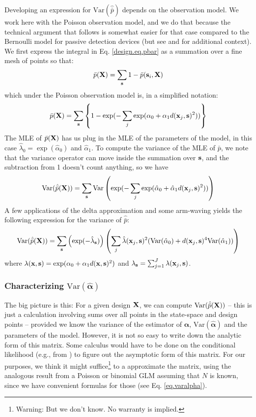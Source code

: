 Developing an expression for $\mbox{Var}(\hat{\bar{p}})$ depends on
the observation model. 
We work here with the Poisson observation model, and we do that
because the technical argument that follows is somewhat easier for
that case compared to the Bernoulli model for passive detection
devices (but see
\citet{huggins:1989} and \citet{alho:1990} for additional context). 
We first express the integral in Eq.
\ref{design.eq.pbar} as a summation over a fine mesh of points so
that:
\[
 \bar{p}({\bf X}) = \sum_{{\bf s}} 1 - \bar{p}({\bf s}_{i},{\bf X})
\]
which under the Poisson observation model is, in a simplified notation:
\[
 \bar{p}({\bf X}) = \sum_{{\bf s}} \left\{
1 -  \exp(- \sum_{j}
 \exp(\alpha_{0} + \alpha_{1}  d({\bf x}_{j}, {\bf s})^2))
\right\}
\]
The MLE of $\bar{p}({\bf X})$ has us plug in the MLE of the parameters
of the model, in this case $\hat{\lambda}_{0} = \exp(
\hat{\alpha}_{0})$ and $\hat{\alpha}_{1}$. 
To compute the variance of the MLE of $\bar{p}$, we note that the
variance operator can move inside the summation over ${\bf s}$, and
the subtraction from 1 doesn't count anything, so we have
\[
\mbox{Var}( \hat{\bar{p}}({\bf X}) ) = \sum_{{\bf s}} \mbox{Var}
\left( \exp(- \sum_{j} \exp(\hat{\alpha}_{0} + \hat{\alpha}_{1} d({\bf
    x}_{j}, {\bf s})^2)) \right)
\]
A few applications of the delta approximation and some arm-waving yields 
the following expression for the variance of
$\hat{\bar{p}}$:
\[
\mbox{Var}( \hat{\bar{p}}({\bf X}) )  =
\sum_{{\bf s}} \left( \exp( - \hat{\lambda}_{\bf s} )  \right)
\left(    \sum_{j}  \hat{\lambda}({\bf x}_{j},{\bf s})^{2} (
 \mbox{Var}( \hat{\alpha}_{0}) +
  d({\bf x}_{j}, {\bf    s})^4
\mbox{Var}( \hat{\alpha}_{1})  )
  \right)
\]
where $\lambda({\bf x},{\bf s}) = \exp( \alpha_{0} + \alpha_{1} d({\bf
  x},{\bf s})^{2})$ and $\lambda_{\bf s} = \sum_{j=1}^{J} \lambda({\bf
  x}_{j},{\bf s})$.


\subsubsection{Characterizing $\mbox{Var}( \hat{\bm \alpha})$ }

The big picture is this: For a given design ${\bf X}$, we can compute
$\mbox{Var}(\hat{\bar{p}}({\bf X}))$ -- this is just a calculation
involving sums over all points in the state-space and design points
-- provided we know the variance of the estimator of ${\bm \alpha}$,
$\mbox{Var}(\hat{\bm \alpha})$ and the parameters of the model.
However, it is not so easy to write down the analytic form of this
matrix.  Some calculus would have to be done on the conditional
likelihood (e.g., from \citet{borchers_efford:2008}) to figure out the
asymptotic form of this matrix.  For our purposes, we think it might
suffice\footnote{Warning: But we don't know. No warranty is implied.}
to a approximate the matrix, using the analogous result from a Poisson
or binomial GLM assuming that $N$ is known, since we have convenient
formulas for those (see Eq. \ref{eq.varalpha}).

